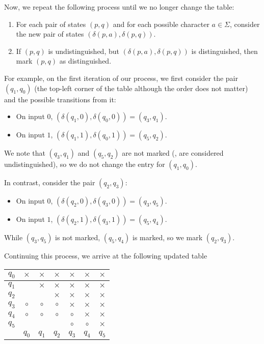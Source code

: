 \documentclass[11pt]{book}
\begin{document}
\vspace{1em}

Now, we repeat the following process until we no longer change the table:
\begin{enumerate}[itemsep=0pt]
  \item For each pair of states $(p, q)$ and for each possible character $a \in \Sigma$, consider the new pair of states $(\delta(p, a), \delta(p, q))$.
  \item If $(p, q)$ is undistinguished, but $(\delta(p, a), \delta(p, q))$ is distinguished, then mark $(p, q)$ as distinguished.
\end{enumerate}

For example, on the first iteration of our process, we first consider the pair $(q_1, q_0)$ (the top-left corner of the table although the order does not matter) and the possible transitions from it:
\begin{itemize}[itemsep=0pt]
  \item On input $0$, $(\delta(q_1, 0), \delta(q_0, 0)) = (q_3, q_1)$.
  \item On input $1$, $(\delta(q_1, 1), \delta(q_0, 1)) = (q_5, q_2)$.
\end{itemize}
We note that $(q_3, q_1)$ and $(q_5, q_2)$ are not marked (\ie, are considered undistinguished), so we do not change the entry for $(q_1, q_0)$.

In contrast, consider the pair $(q_2, q_3)$:
\begin{itemize}[itemsep=0pt]
  \item On input $0$, $(\delta(q_2, 0), \delta(q_3, 0)) = (q_3, q_5)$.
  \item On input $1$, $(\delta(q_2, 1), \delta(q_3, 1)) = (q_5, q_4)$.
\end{itemize}
While $(q_3, q_5)$ is not marked, $(q_5, q_4)$ is marked, so we mark $(q_2, q_3)$.

Continuing this process, we arrive at the following updated table

\vspace{1em}

\begin{tabular}{|c|c|c|c|c|c|c|}
  \hline
  $q_0$ & $\times$ & $\times$ & $\times$ & $\times$ & $\times$ & $\times$ \\
  \hline
  $q_1$ &          & $\times$ & $\times$ & $\times$ & $\times$ & $\times$ \\
  \hline
  $q_2$ &          &          & $\times$ & $\times$ & $\times$ & $\times$ \\
  \hline
  $q_3$ & $\circ$  & $\circ$  & $\circ$  & $\times$ & $\times$ & $\times$ \\
  \hline
  $q_4$ & $\circ$  & $\circ$  & $\circ$  & $\circ$  & $\times$ & $\times$ \\
  \hline
  $q_5$ &          &          &          & $\circ$  & $\circ$  & $\times$ \\
  \hline
        & $q_0$    & $q_1$    & $q_2$    & $q_3$    & $q_4$    & $q_5$    \\
  \hline
\end{tabular}
\end{document}
